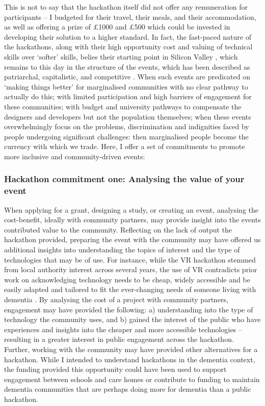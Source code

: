 This is not to say that the hackathon itself did not offer any remuneration for participants – I budgeted for their travel, their meals, and their accommodation, as well as offering a prize of £1000 and £500 which could be invested in developing their solution to a higher standard. In fact, the fast-paced nature of the hackathons, along with their high opportunity cost and valuing of technical skills over `softer' skills, belies their starting point in Silicon Valley  \citep{irani_hackathons_2015}, which remains to this day in the structure of the events, which has been described as patriarchal, capitalistic, and competitive \citep{evans_disruption_2018}. When such events are predicated on ‘making things better’ for marginalised communities with no clear pathway to actually do this; with limited participation and high barriers of engagement for these communities; with budget and university pathways to compensate the designers and developers but not the population themselves; when these events overwhelmingly focus on the problems, discrimination and indignities faced by people undergoing significant challenges: then marginalised people become the currency with which we trade. Here, I offer a set of commitments to promote more inclusive and community-driven events:

\subsubsection{Hackathon commitment one: Analysing the value of your event}
\label{DiscussionThree:CommitOne}
When applying for a grant, designing a study, or creating an event, analysing the cost-benefit, ideally with community partners, may provide insight into the events contributed value to the community. Reflecting on the lack of output the hackathon provided, preparing the event with the community may have offered us additional insights into understanding the topics of interest and the type of technologies that may be of use. For instance, while the VR hackathon stemmed from local authority interest across several years, the use of VR contradicts prior work on acknowledging technology needs to be cheap, widely accessible and be easily adapted and tailored to fit the ever-changing needs of someone living with dementia \citep{lorenz2019technology}. By analysing the cost of a project with community partners, engagement may have provided the following: a) understanding into the type of technology the community uses, and b) gained the interest of the public who have experiences and insights into the cheaper and more accessible technologies – resulting in a greater interest in public engagement across the hackathon. Further, working with the community may have provided other alternatives for a hackathon. While I intended to understand hackathons in the dementia context, the funding provided this opportunity could have been used to support engagement between schools and care homes or contribute to funding to maintain dementia communities that are perhaps doing more for dementia than a public hackathon.

